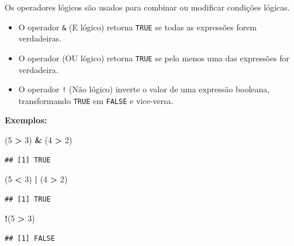 \documentclass[
]{book}
\newenvironment{Shaded}{\begin{snugshade}}{\end{snugshade}}
\newcommand{\DecValTok}[1]{\textcolor[rgb]{0.00,0.00,0.81}{#1}}
\newcommand{\NormalTok}[1]{#1}
\newcommand{\SpecialCharTok}[1]{\textcolor[rgb]{0.81,0.36,0.00}{\textbf{#1}}}
\theoremstyle{definition}
\theoremstyle{definition}
\theoremstyle{definition}
\theoremstyle{definition}
\theoremstyle{remark}
\begin{document}
Os operadores lógicos são usados para combinar ou modificar condições lógicas.

\begin{itemize}
\item
  O operador \texttt{\&} (E lógico) retorna \texttt{TRUE} se todas as expressões forem verdadeiras.
\item
  O operador \texttt{\textbar{}} (OU lógico) retorna \texttt{TRUE} se pelo menos uma das expressões for verdadeira.
\item
  O operador \texttt{!} (Não lógico) inverte o valor de uma expressão booleana, transformando \texttt{TRUE} em \texttt{FALSE} e vice-versa.
\end{itemize}

\textbf{Exemplos:}

\begin{Shaded}
\begin{Highlighting}[]
\NormalTok{(}\DecValTok{5} \SpecialCharTok{\textgreater{}} \DecValTok{3}\NormalTok{) }\SpecialCharTok{\&}\NormalTok{ (}\DecValTok{4} \SpecialCharTok{\textgreater{}} \DecValTok{2}\NormalTok{) }
\end{Highlighting}
\end{Shaded}

\begin{verbatim}
## [1] TRUE
\end{verbatim}

\begin{Shaded}
\begin{Highlighting}[]
\NormalTok{(}\DecValTok{5} \SpecialCharTok{\textless{}} \DecValTok{3}\NormalTok{) }\SpecialCharTok{|}\NormalTok{ (}\DecValTok{4} \SpecialCharTok{\textgreater{}} \DecValTok{2}\NormalTok{) }
\end{Highlighting}
\end{Shaded}

\begin{verbatim}
## [1] TRUE
\end{verbatim}

\begin{Shaded}
\begin{Highlighting}[]
\SpecialCharTok{!}\NormalTok{(}\DecValTok{5} \SpecialCharTok{\textgreater{}} \DecValTok{3}\NormalTok{)  }
\end{Highlighting}
\end{Shaded}

\begin{verbatim}
## [1] FALSE
\end{verbatim}
\end{document}
